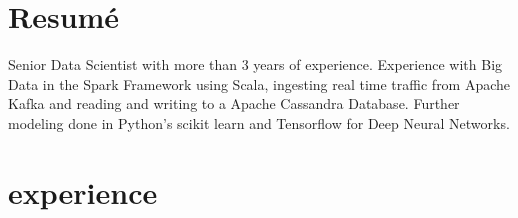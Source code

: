 \documentclass[]{friggeri-cv}
\begin{document}
\section{Resumé}

Senior Data Scientist with more than 3 years of experience. Experience with Big Data in the Spark Framework using Scala, ingesting real time traffic from Apache Kafka and reading and writing to a Apache Cassandra Database. Further modeling done in Python's scikit learn and Tensorflow for Deep Neural Networks.%






\section{experience}
\end{document}

